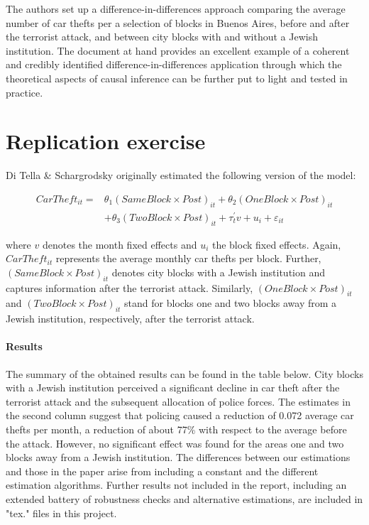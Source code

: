 \documentclass[11pt, a4paper, leqno]{article}
\begin{document}
The authors set up a difference-in-differences approach comparing the average number of car thefts per a selection of blocks in Buenos Aires, before and after the terrorist attack, and between city blocks with and without a Jewish institution. The document at hand provides an excellent example of a coherent and credibly identified difference-in-differences application through which the theoretical aspects of causal inference can be further put to light and tested in practice.

\section{Replication exercise}

Di Tella \& Schargrodsky originally estimated the following version of the model:

\begin{equation}\label{did_mode_1}
\begin{aligned}
CarTheft_{it} = & \theta_1 (Same Block \times Post)_{it} + \theta_2(One Block \times Post)_{it} \\
& + \theta_3(Two Block \times Post)_{it} + \tau_t^\prime v + u_i + \varepsilon_{it}
\end{aligned}
\end{equation}

where $v$ denotes the month fixed effects and $u_i$ the block fixed effects. Again, $CarTheft_{it}$ represents the average monthly car thefts per block. Further, $(Same Block \times Post)_{it}$ denotes city blocks with a Jewish institution and captures information after the terrorist attack. Similarly, $(One Block \times Post)_{it}$ and $(Two Block \times Post)_{it}$ stand for blocks one and two blocks away from a Jewish institution, respectively, after the terrorist attack.


\paragraph{Results}


The summary of the obtained results can be found in the table below. City blocks with a Jewish institution perceived a significant decline in car theft after the terrorist attack and the subsequent allocation of police forces. The estimates in the second column suggest that policing caused a reduction of 0.072 average car thefts per month, a reduction of about 77\% with respect to the average before the attack. However, no significant effect was found for the areas one and two blocks away from a Jewish institution. The
differences between our estimations and those in the paper arise from including a constant and the different estimation algorithms. Further results not included in the report, including an extended battery of robustness checks and alternative estimations, are included in "tex." files in this project.
\end{document}
